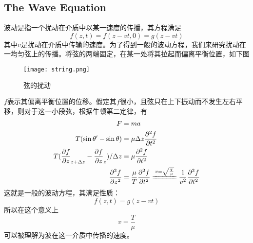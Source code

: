 \documentclass[14pt,oneside]{book}
\begin{document}
\begin{large}
\subsection{The Wave Equation}
波动是指一个扰动在介质中以某一速度的传播，其方程满足
\begin{equation}
  f(z,t)=f(z-vt,0)=g(z-vt)
\end{equation}
其中$v$是扰动在介质中传输的速度。为了得到一般的波动方程，我们来研究扰动在一均匀弦上的传播。将弦的两端固定，在某一处将其拉起而偏离平衡位置，如下图
\begin{figure}[H]
\centering
  \texttt{[image: string.png]}
  \caption{弦的扰动}
\end{figure}
$f$表示其偏离平衡位置的位移。假定其$f$很小，且弦只在上下振动而不发生左右平移，则对于这一小段弦，根据牛顿第二定律，有
\begin{equation}
  \begin{aligned}
  	F&=ma\\
  	T(\sin{\theta'}-\sin\theta)&=\mu \Delta z\pdv[2]{f}{t}\\
  	T(\pdv{f}{z}_{z+\Delta z}-\pdv{f}{z}_{z})/{\Delta z}&=\mu\pdv[2]{f}{t}\\
  	\pdv[2]{f}{z}&=\frac{\mu}{T}\pdv[2]{f}{t}\xlongequal[]{v=\sqrt{\frac{T}{\mu}}}\frac{1}{v^2}\pdv[2]{f}{t}
  \end{aligned}
  \end{equation}
这就是一般的波动方程，其满足性质：
\begin{equation}
  f(z,t)=g(z-vt)
\end{equation}
所以在这个意义上
\begin{equation}
  v=\frac{T}{\mu}
\end{equation}
可以被理解为波在这一介质中传播的速度。

\end{large}
\end{document}
